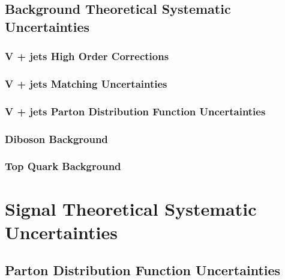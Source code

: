 \documentclass[10pt,twoside,cucitura,classica,openany]{toptesi}
\begin{document}


\subsection{Background Theoretical Systematic Uncertainties}
\label{sec:backgr-theor-syst}



\subsubsection{V + jets High Order Corrections}
\label{sec:v-+-jets}



\subsubsection{V + jets Matching Uncertainties}
\label{sec:v-+-jets-matching}



\subsubsection{V + jets Parton Distribution Function Uncertainties}
\label{sec:v-+-jets-pdf}



\subsubsection{Diboson Background}
\label{sec:diboson-background}



\subsubsection{Top Quark Background}
\label{sec:top-quark-background}



\section{Signal Theoretical Systematic Uncertainties}
\label{sec:ther-syst-uncert}



\subsection{Parton Distribution Function Uncertainties}
\label{sec:pdf-uncertainties}
\end{document}
